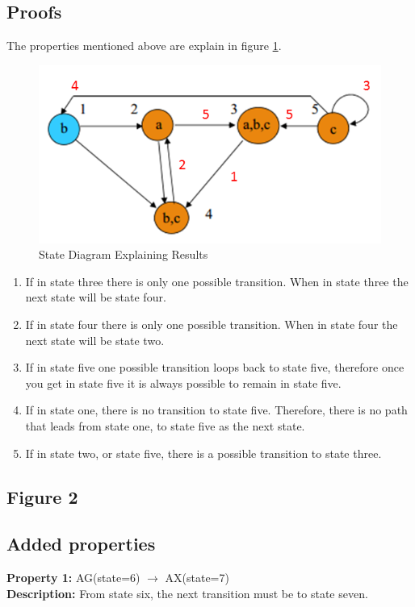 \documentclass[11pt]{article}
\begin{document}
	\subsection{Proofs}
	The properties mentioned above are explain in figure \ref{p2_p}.
	\begin{figure}[h]\centering
	\includegraphics[height=0.45\textwidth]{images/p2_1_proof.png}
		\caption{State Diagram Explaining Results}
			\label{p2_p}
		\end{figure}
\begin{enumerate}
\item If in state three there is only one possible transition. When in state three the next state will be state four.
\item  If in state four there is only one possible transition. When in state four the next state will be state two.
\item  If in state five one possible transition loops back to state five, therefore once you get in state five it is always possible to remain in state five.
\item  If in state one, there is no transition to state five. Therefore, there is no path that leads from state one, to state five as the next state.
\item  If in state two, or state five, there is a possible transition to state three.
\end{enumerate}	

	
\subsection{Figure 2}
	\subsection{Added properties}
	
		\textbf{Property 1:} 	AG(state=6) $\to$ AX(state=7) 	\\	
		\textbf{Description:} From state six, the next transition must be to state seven. \\
		\vspace{12pt}
		
\end{document}

